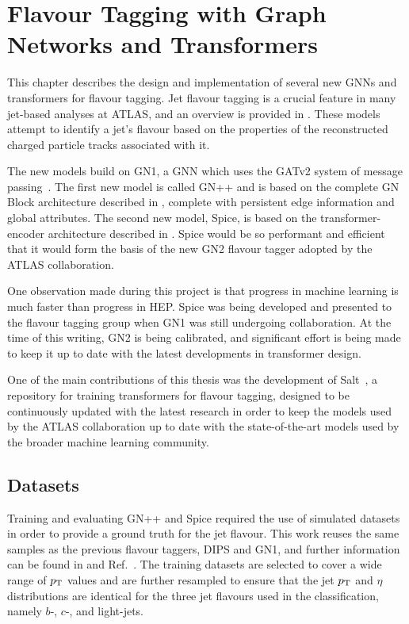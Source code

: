 
\chapter{Flavour Tagging with Graph Networks and Transformers}
\label{ch:spice}

This chapter describes the design and implementation of several new GNNs and transformers for flavour tagging.
Jet flavour tagging is a crucial feature in many jet-based analyses at ATLAS, and an overview is provided in .
These models attempt to identify a jet's flavour based on the properties of the reconstructed charged particle tracks associated with it.

The new models build on GN1, a GNN which uses the GATv2 system of message passing~\cite{GATv2}.
The first new model is called GN++ and is based on the complete GN Block architecture described in , complete with persistent edge information and global attributes.
The second new model, Spice, is based on the transformer-encoder architecture described in .
Spice would be so performant and efficient that it would form the basis of the new GN2 flavour tagger adopted by the ATLAS collaboration.

One observation made during this project is that progress in machine learning is much faster than progress in HEP.
Spice was being developed and presented to the flavour tagging group when GN1 was still undergoing collaboration.
At the time of this writing, GN2 is being calibrated, and significant effort is being made to keep it up to date with the latest developments in transformer design.

One of the main contributions of this thesis was the development of Salt~\cite{Salt}, a repository for training transformers for flavour tagging, designed to be continuously updated with the latest research in order to keep the models used by the ATLAS collaboration up to date with the state-of-the-art models used by the broader machine learning community.

\section{Datasets}

Training and evaluating GN++ and Spice required the use of simulated datasets in order to provide a ground truth for the jet flavour.
This work reuses the same samples as the previous flavour taggers, DIPS and GN1, and further information can be found in \textcite{AlexThesis} and Ref.~\cite{GN1}.
The training datasets are selected to cover a wide range of $p_{\text{T}}$ values and are further resampled to ensure that the jet $p_{\text{T}}$ and $\eta$ distributions are identical for the three jet flavours used in the classification, namely $b$-, $c$-, and light-jets.

